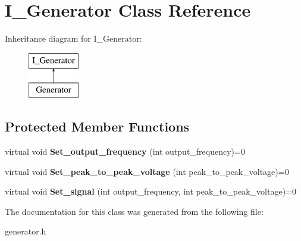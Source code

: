 \hypertarget{class_i___generator}{}\section{I\+\_\+\+Generator Class Reference}
\label{class_i___generator}
Inheritance diagram for I\+\_\+\+Generator\+:\begin{figure}[H]
\begin{center}
\leavevmode
\includegraphics[height=2.000000cm]{class_i___generator}
\end{center}
\end{figure}
\subsection*{Protected Member Functions}
\begin{DoxyCompactItemize}
\item 
\mbox{\label{class_i___generator_a12c843337527b9db8c5d0a93136445c8}} 
virtual void {\bfseries Set\+\_\+output\+\_\+frequency} (int output\+\_\+frequency)=0
\item 
\mbox{\label{class_i___generator_ad9b36eed2a10e08aad517bf0bcb07159}} 
virtual void {\bfseries Set\+\_\+peak\+\_\+to\+\_\+peak\+\_\+voltage} (int peak\+\_\+to\+\_\+peak\+\_\+voltage)=0
\item 
\mbox{\label{class_i___generator_a3e32028db1035c4d5fa0716da73561ee}} 
virtual void {\bfseries Set\+\_\+signal} (int output\+\_\+frequency, int peak\+\_\+to\+\_\+peak\+\_\+voltage)=0
\end{DoxyCompactItemize}


The documentation for this class was generated from the following file\+:\begin{DoxyCompactItemize}
\item 
generator.\+h\end{DoxyCompactItemize}
